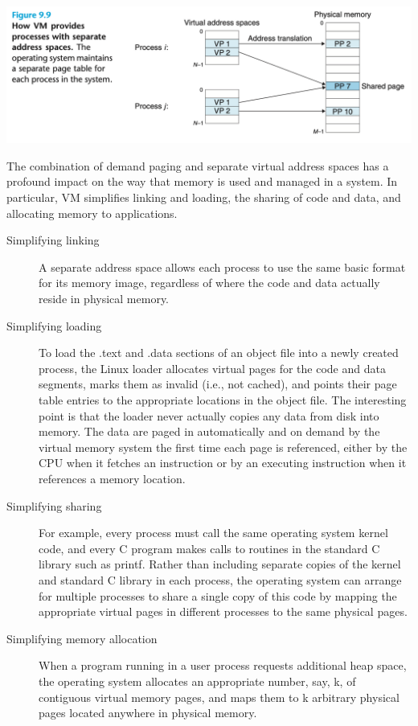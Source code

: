 \documentclass[11pt]{article}
\begin{document}
\begin{center}
\includegraphics[width=.9\linewidth]{pics/figure9.9-vm-management.png}
\end{center}

The combination of demand paging and separate virtual address spaces has a profound impact on the way that memory is used and managed in a system. In particular, VM simplifies linking and loading, the sharing of code and data, and allocating memory to applications.\\
\begin{description}
\item[{Simplifying linking}] A separate address space allows each process to use the same basic format for its memory image, regardless of where the code and data actually reside in physical memory.\\
\item[{Simplifying loading}] To load the .text and .data sections of an object file into a newly created process, the Linux loader allocates virtual pages for the code and data segments, marks them as invalid (i.e., not cached), and points their page table entries to the appropriate locations in the object file. The interesting point is that the loader never actually copies any data from disk into memory. The data are paged in automatically and on demand by the virtual memory system the first time each page is referenced, either by the CPU when it fetches an instruction or by an executing instruction when it references a memory location.\\
\item[{Simplifying sharing}] For example, every process must call the same operating system kernel code, and every C program makes calls to routines in the standard C library such as printf. Rather than including separate copies of the kernel and standard C library in each process, the operating system can arrange for multiple processes to share a single copy of this code by mapping the appropriate virtual pages in different processes to the same physical pages.\\
\item[{Simplifying memory allocation}] When a program running in a user process requests additional heap space, the operating system allocates an appropriate number, say, k, of contiguous virtual memory pages, and maps them to k arbitrary physical pages located anywhere in physical memory.\\
\end{description}
\end{document}
